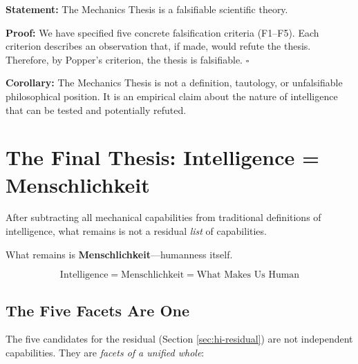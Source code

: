\begin{tcolorbox}[colback=green!5!white, colframe=green!75!black,
    title=\textbf{Theorem UNMAPPED_HI-6: Falsifiability}]
\textbf{Statement:} The Mechanics Thesis is a falsifiable scientific theory.

\textbf{Proof:} We have specified five concrete falsification criteria (F1--F5). Each criterion describes an observation that, if made, would refute the thesis. Therefore, by Popper's criterion, the thesis is falsifiable. \hfill $\square$

\textbf{Corollary:} The Mechanics Thesis is not a definition, tautology, or unfalsifiable philosophical position. It is an empirical claim about the nature of intelligence that can be tested and potentially refuted.
\end{tcolorbox}


\section{The Final Thesis: Intelligence = Menschlichkeit}
\label{sec:hi-menschlichkeit}

\begin{tcolorbox}[colback=blue!10!white, colframe=blue!75!black,
    title=\textbf{The Culminating Insight}]

After subtracting all mechanical capabilities from traditional definitions of intelligence, what remains is not a residual \textit{list} of capabilities.

What remains is \textbf{Menschlichkeit}---humanness itself.

\begin{equation}
\boxed{\text{Intelligence} = \text{Menschlichkeit} = \text{What Makes Us Human}}
\end{equation}

\end{tcolorbox}

\subsection{The Five Facets Are One}

The five candidates for the residual (Section \ref{sec:hi-residual}) are not independent capabilities. They are \textit{facets of a unified whole}:

